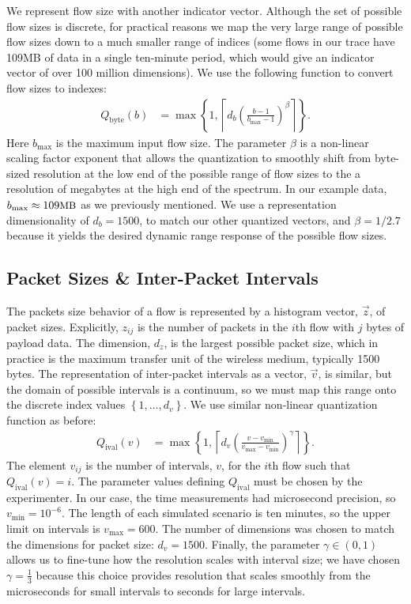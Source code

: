 \documentclass[twocolumn,final]{svjour3}
\newcommand{\caps}[1]{{\small{#1}}}
\newcommand{\Qb}{Q_{\text{byte}}}
\newcommand{\Qi}{Q_{\text{ival}}}
\newcommand{\set}[1]{\left\{#1\right\}}
\newcommand{\ceil}[1]{\left\lceil#1\right\rceil}
\newcommand{\fracx}[2]{#1/#2}
\newcommand{\fracp}[2]{\left(\frac{#1}{#2}\right)}
\begin{document}
We represent flow size with another indicator vector. Although the set of possible flow sizes is discrete, for practical reasons we map the very large range of possible flow sizes down to a much smaller range of indices (some flows in our trace have 109\caps{MB} of data in a single ten-minute period, which would give an indicator vector of over 100 million dimensions). We use the following function to convert flow sizes to indexes:
\begin{align*}
\Qb(b) &= \max\set{1,\ceil{d_b\fracp{b-1}{b_{\max}-1}^\beta}}.
\end{align*}
Here $b_{\max}$ is the maximum input flow size. The parameter $\beta$ is a non-linear scaling factor exponent that allows the quantization to smoothly shift from byte-sized resolution at the low end of the possible range of flow sizes to the a resolution of megabytes at the high end of the spectrum. In our example data, $b_{\max}\approx109\text{\caps{MB}}$ as we previously mentioned. We use a representation dimensionality of $d_b=1500$, to match our other quantized vectors, and $\beta=\fracx{1}{2.7}$ because it yields the desired dynamic range response of the possible flow sizes.

\subsection{Packet Sizes \& Inter-Packet Intervals}

The packets size behavior of a flow is represented by a histogram vector, $\vec{z}$, of packet sizes. Explicitly,  $z_{ij}$ is the number of packets in the $i$th flow with $j$ bytes of payload data. The dimension, $d_z$, is the largest possible packet size, which in practice is the maximum transfer unit of the wireless medium, typically 1500 bytes. The representation of inter-packet intervals as a vector, $\vec{v}$, is similar, but the domain of possible intervals is a continuum, so we must map this range onto the discrete index values $\left\{1,\dots,d_v\right\}$. We use similar non-linear quantization function as before:
\begin{align}
\label{eqn:interval-quantization}
\Qi(v) &= \max\set{1,\ceil{d_v\fracp{v-v_{\min}}{v_{\max}-v_{\min}}^\gamma}}.
\end{align}
The element $v_{ij}$ is the number of intervals, $v$, for the $i$th flow such that $\Qi(v)=i$.
The parameter values defining $\Qi$ must be chosen by the experimenter. In our case, the time measurements had microsecond precision, so $v_{\min}=10^{-6}$. The length of each simulated scenario is ten minutes, so the upper limit on intervals is $v_{\max}=600$. The number of dimensions was chosen to match the dimensions for packet size: $d_v=1500$. Finally, the parameter $\gamma\in(0,1)$ allows us to fine-tune how the resolution scales with interval size; we have chosen $\gamma=\frac{1}{3}$ because this choice provides resolution that scales smoothly from the microseconds for small intervals to seconds for large intervals.
\end{document}
